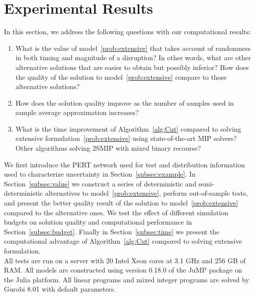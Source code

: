 \documentclass[11pt]{article}
\begin{document}
\section{Experimental Results} \label{sec:results}
	In this section, we address the following questions with our computational results:
	\begin{enumerate}
		\item What is the value of model~\eqref{prob:extensive} that takes account of randomness in both timing and magnitude of a disruption? In other words, what are other alternative solutions that are easier to obtain but possibly inferior? How does the quality of the solution to model~\eqref{prob:extensive} compare to those alternative solutions?
		\item How does the solution quality improve as the number of samples used in sample average approximation increases? 
		\item What is the time improvement of Algorithm~\ref{alg:Cut} compared to solving extensive formulation~\eqref{prob:extensive} using state-of-the-art MIP solvers? Other algorithms solving 2SMIP with mixed binary recourse?
	\end{enumerate}
	We first introduce the PERT network used for test and distribution information used to characterize uncertainty in Section~\ref{subsec:example}. In Section~\ref{subsec:value} we construct a series of deterministic and semi-deterministic alternatives to model~\eqref{prob:extensive}, perform out-of-sample tests, and present the better quality result of the solution to model~\eqref{prob:extensive} compared to the alternative ones. We test the effect of different simulation budgets on solution quality and computational performance in Section~\ref{subsec:budget}. Finally in Section~\ref{subsec:time} we present the computational advantage of Algorithm~\ref{alg:Cut} compared to solving extensive formulation.\\
	\newline
	All tests are run on a server with 20 Intel Xeon cores at 3.1 GHz and 256 GB of RAM. All models are constructed using version 0.18.0 of the JuMP package \cite{DunningHuchetteLubin2017} on the Julia platform. All linear programs and mixed integer programs are solved by Gurobi 8.01 \cite{gurobi2016} with default parameters.
	
\end{document}
